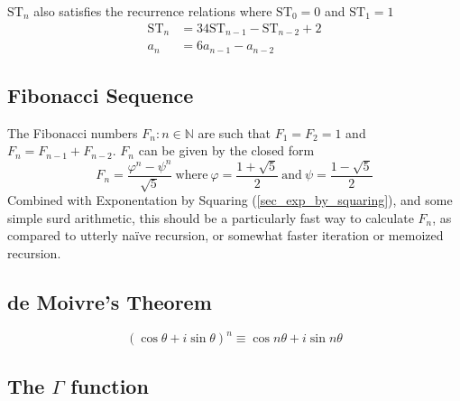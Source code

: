 \documentclass[fleqn,a4paper,11pt]{article}
\begin{document}
    \(\mathrm{ST}_n\) also satisfies the recurrence relations where
    \(\mathrm{ST}_0 = 0\) and \(\mathrm{ST}_1 = 1\)
    \begin{align}
    \mathrm{ST}_n &= 34\mathrm{ST}_{n - 1} - \mathrm{ST}_{n - 2} + 2\\
    a_n &= 6a_{n - 1} - a_{n - 2}
    \end{align}


    \subsection{Fibonacci Sequence}

    The Fibonacci numbers \(F_n: n \in \mathbb N\) are such that
    \(F_1 = F_2 = 1\) and \(F_n = F_{n - 1} + F_{n - 2}\).  \(F_n\) can be given
    by the closed form
    \begin{equation}
    F_n = \frac{\varphi^n - \psi^n}{\sqrt 5}
    \ \text{where}\ \varphi = \frac{1 + \sqrt 5} 2
    \ \text{and}\ \psi = \frac{1 - \sqrt 5} 2
    \end{equation}
    Combined with Exponentation by Squaring (\ref{sec_exp_by_squaring}), and
    some simple surd arithmetic, this should be a particularly fast way to
    calculate \(F_n\), as compared to utterly na\"ive recursion, or somewhat
    faster iteration or memoized recursion.

    \subsection{de Moivre's Theorem}

    \begin{equation}
    (\cos \theta + i \sin \theta)^n \equiv \cos n\theta + i \sin n\theta
    \end{equation}

    \subsection[The \(\Gamma\) function]{The \boldmath\(\Gamma\) function}
\end{document}
